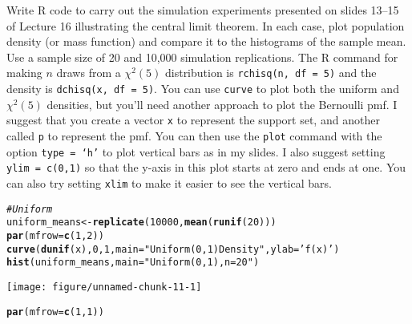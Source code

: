 \documentclass[addpoints,12pt]{exam}\usepackage[]{graphicx}\usepackage[]{color}
\makeatletter
\def\maxwidth{ %
  \ifdim\Gin@nat@width>\linewidth
    \linewidth
  \else
    \Gin@nat@width
  \fi
}
\newcommand{\hlnum}[1]{\textcolor[rgb]{0.686,0.059,0.569}{#1}}%
\newcommand{\hlstr}[1]{\textcolor[rgb]{0.192,0.494,0.8}{#1}}%
\newcommand{\hlcom}[1]{\textcolor[rgb]{0.678,0.584,0.686}{\textit{#1}}}%
\newcommand{\hlstd}[1]{\textcolor[rgb]{0.345,0.345,0.345}{#1}}%
\newcommand{\hlkwb}[1]{\textcolor[rgb]{0.69,0.353,0.396}{#1}}%
\newcommand{\hlkwc}[1]{\textcolor[rgb]{0.333,0.667,0.333}{#1}}%
\newcommand{\hlkwd}[1]{\textcolor[rgb]{0.737,0.353,0.396}{\textbf{#1}}}%
\newenvironment{kframe}{%
 \def\at@end@of@kframe{}%
 \ifinner\ifhmode%
  \def\at@end@of@kframe{\end{minipage}}%
  \begin{minipage}{\columnwidth}%
 \fi\fi%
 \def\FrameCommand##1{\hskip\@totalleftmargin \hskip-\fboxsep
 \colorbox{shadecolor}{##1}\hskip-\fboxsep
     \hskip-\linewidth \hskip-\@totalleftmargin \hskip\columnwidth}%
 \MakeFramed {\advance\hsize-\width
   \@totalleftmargin\z@ \linewidth\hsize
   \@setminipage}}%
 {\par\unskip\endMakeFramed%
 \at@end@of@kframe}
\newenvironment{knitrout}{}{} %
\makeatother
\begin{document}
\begin{questions}

\question Write R code to carry out the simulation experiments presented on slides 13--15 of Lecture 16 illustrating the central limit theorem. 
In each case, plot population density (or mass function) and compare it to the histograms of the sample mean.
Use a sample size of 20 and 10,000 simulation replications.
The R command for making $n$ draws from a $\chi^2(5)$ distribution is \texttt{rchisq(n, df = 5)} and the density is \texttt{dchisq(x, df = 5)}.
You can use \texttt{curve} to plot both the uniform and $\chi^2(5)$ densities, but you'll need another approach to plot the Bernoulli pmf.
I suggest that you create a vector \texttt{x} to represent the support set, and another called \texttt{p} to represent the pmf.
You can then use the \texttt{plot} command with the option \texttt{type = `h'} to plot vertical bars as in my slides.
I also suggest setting \texttt{ylim = c(0,1)} so that the y-axis in this plot starts at zero and ends at one.
You can also try setting \texttt{xlim} to make it easier to see the vertical bars.
	\begin{solution}
\begin{knitrout}
\color{fgcolor}\begin{kframe}
\begin{alltt}
\hlcom{# Uniform }
\hlstd{uniform_means} \hlkwb{<-} \hlkwd{replicate}\hlstd{(}\hlnum{10000}\hlstd{,} \hlkwd{mean}\hlstd{(}\hlkwd{runif}\hlstd{(}\hlnum{20}\hlstd{)))}
\hlkwd{par}\hlstd{(}\hlkwc{mfrow} \hlstd{=} \hlkwd{c}\hlstd{(}\hlnum{1}\hlstd{,} \hlnum{2}\hlstd{))}
\hlkwd{curve}\hlstd{(}\hlkwd{dunif}\hlstd{(x),} \hlnum{0}\hlstd{,} \hlnum{1}\hlstd{,} \hlkwc{main} \hlstd{=} \hlstr{"Uniform(0,1) Density"}\hlstd{,} \hlkwc{ylab} \hlstd{=} \hlstr{'f(x)'}\hlstd{)}
\hlkwd{hist}\hlstd{(uniform_means,} \hlkwc{main} \hlstd{=} \hlstr{"Uniform(0,1), n = 20"}\hlstd{)}
\end{alltt}
\end{kframe}
\texttt{[image: figure/unnamed-chunk-11-1]} 
\begin{kframe}\begin{alltt}
\hlkwd{par}\hlstd{(}\hlkwc{mfrow} \hlstd{=} \hlkwd{c}\hlstd{(}\hlnum{1}\hlstd{,} \hlnum{1}\hlstd{))}


\end{alltt}
\end{kframe}
\end{knitrout}
\end{solution}
\end{questions}
\end{document}
